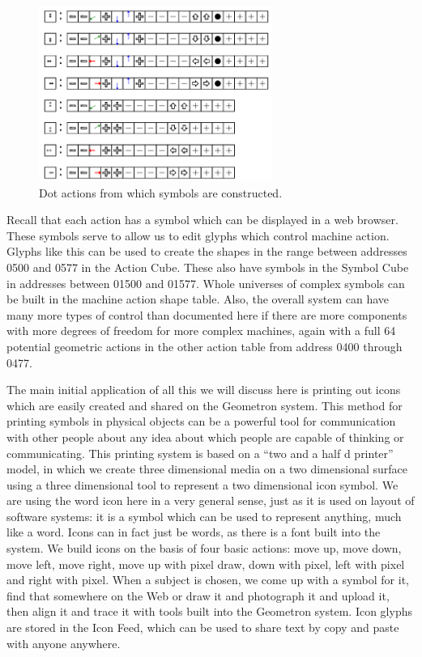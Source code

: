 \begin{figure}
	\centering
	\includegraphics[width=3in]{figures/machines/actions05xx.png}
	\caption[actions05xx]
	{Dot actions from which symbols are constructed.}
\end{figure}

Recall that each action has a symbol which can be displayed in a web browser.  These symbols serve to allow us to edit glyphs which control machine action.  Glyphs like this can be used to create the shapes in the range between addresses 0500 and 0577 in the Action Cube.  These also have symbols in the Symbol Cube in addresses between 01500 and 01577.  Whole universes of complex symbols can be built in the machine action shape table. Also, the overall system can have many more types of control than documented here if there are more components with more degrees of freedom for more complex machines, again with a full 64 potential geometric actions in the other action table from address 0400 through 0477.

The main initial application of all this we will discuss here is printing out icons which are easily created and shared on the Geometron system.  This method for printing symbols in physical objects can be a powerful tool for communication with other people about any idea about which people are capable of thinking or communicating.  This printing system is based on a ``two and a half d printer'' model, in which we create three dimensional media on a two dimensional surface using a three dimensional tool to represent a two dimensional icon symbol.  We are using the word icon here in a very general sense, just as it is used on layout of software systems: it is a symbol which can be used to represent anything, much like a word.  Icons can in fact just be words, as there is a font built into the system.  We build icons on the basis of four basic actions: move up, move down, move left, move right, move up with pixel draw, down with pixel, left with pixel and right with pixel.  When a subject is chosen, we come up with a symbol for it, find that somewhere on the Web or draw it and photograph it and upload it, then align it and trace it with tools built into the Geometron system.  Icon glyphs are stored in the Icon Feed, which can be used to share text by copy and paste with anyone anywhere.  

